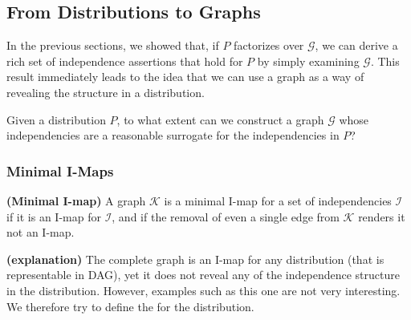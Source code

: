 \documentclass{article}
\newcommand{\bfs}[1]{\textbf{({#1}) }}
\begin{document}
\subsection{From Distributions to Graphs}
In the previous sections, we showed that, if $P$ factorizes over $\mathcal{G}$, we can derive a rich set of independence assertions that hold for $P$ by simply examining $\mathcal{G}$. This result immediately leads to the idea that we can use a graph as a way of revealing the structure in a distribution. 

  Given a distribution $P$, to what extent can we construct a graph $\mathcal{G}$ whose independencies are a reasonable surrogate for the independencies in $P$?

\subsubsection{Minimal I-Maps}
\begin{defa}\bfs{Minimal I-map}\label{def:nmfae}
A graph $\mathcal{K}$ is a minimal I-map for a set of independencies $\mathcal{I}$ if it is an I-map for $\mathcal{I}$, and if the removal of even a single edge from $\mathcal{K}$ renders it not an I-map.
\end{defa}
\begin{rema}\bfs{explanation}
The complete graph is an I-map for any distribution (that is representable in DAG), yet it does not reveal any of the independence structure in the distribution. However, examples such as this one are not very interesting. We therefore try to define the  for the distribution. 
\end{rema}
\end{document}
